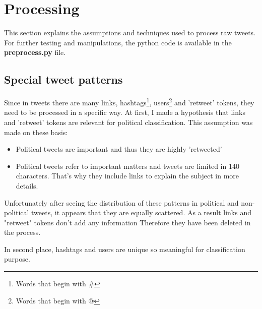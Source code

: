 
\section{Processing}


This section explains the assumptions and techniques used to process raw tweets.\\
For further testing and manipulations, the python code is available in the \textbf{preprocess.py} file.




\subsection{Special tweet patterns}
\label{sec:special_tweet_patterns}
Since in tweets there are many links, hashtags\footnote{Words that begin with \#}, users\footnote{Words that begin with @} and 'retweet' tokens, they need to be processed in a specific way.
At first, I made a hypothesis that links and 'retweet' tokens are relevant for political classification.
This assumption was made on these basis:
\begin{itemize}
\item Political tweets are important and thus they are highly 'retweeted'
\item Political tweets refer to important matters and tweets are limited in 140 characters. 
That's why they include links to explain the subject in more details. 
\end{itemize}
Unfortunately after seeing the distribution of these patterns in political and non-political tweets, it appears that they are equally scattered. As a result links and "retweet" tokens don't add any information Therefore they have been deleted in the process.

In second place, hashtags and users  are unique so meaningful for classification purpose.


  
